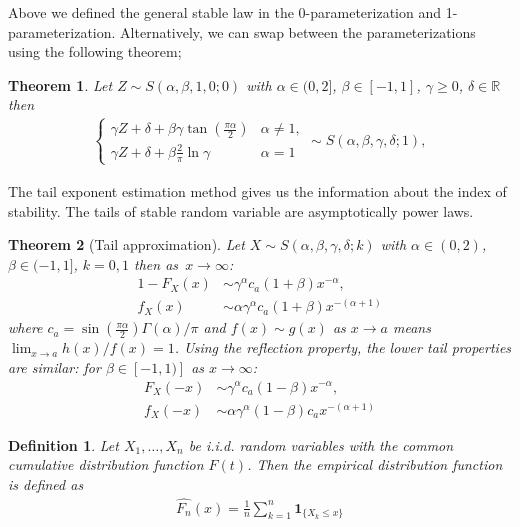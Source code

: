 \documentclass{article}
\newtheorem{theorem}{Theorem}
\newtheorem{definition}{Definition}
\begin{document}
		Above we defined the general stable law in the 0-parameterization and 1-parameterization.
		Alternatively, we can swap between the parameterizations using the following theorem;
		\begin{theorem}Let $Z\sim S(\alpha,\beta,1,0;0)$  with $\alpha \in (0,2]$, $\beta \in [-1,1]$, $\gamma \ge 0$, $\delta\in\mathbb{R}$ then  
			\begin{gather*}
				\begin{cases}
					\gamma Z + \delta + \beta \gamma \tan\left(\frac{\pi\alpha}{2}\right) &\alpha\ne1,\\
					\gamma Z + \delta + \beta \frac{2}{\pi}\ln\gamma  &\alpha=1
				\end{cases}\sim S(\alpha,\beta,\gamma,\delta; 1),
			\end{gather*}
		\end{theorem}

		The tail exponent estimation method gives us the information
		about the index of stability. The tails of stable random variable are asymptotically power laws. 
		\begin{theorem}[Tail approximation] Let $X \sim S(\alpha, \beta , \gamma, \delta; k)$ with $\alpha \in (0,2)$, $\beta \in (-1,1]$, $k=0,1$ then as~$x\to \infty$:
			\begin{align*}
				1 - F_X(x) &\sim \gamma^\alpha c_a (1+\beta)x^{-\alpha},\\
				f_X(x) &\sim \alpha \gamma^\alpha c_a (1+\beta) x^{-(\alpha + 1)}
			\end{align*}
			where $c_a = \sin(\frac{\pi\alpha}{2})\Gamma(\alpha)/\pi$ and $f(x)\sim g(x)$ as $x\to a$ means $\lim_{x\to a} h(x)/f(x) = 1$. Using the reflection property, the lower tail properties are
			similar: for $\beta\in[-1,1)]$ as $x \to \infty$:
			\begin{align*}
				F_X(-x) &\sim  \gamma^\alpha c_a (1-\beta)x^{-\alpha},\\
				f_X(-x) &\sim  \alpha \gamma^\alpha (1-\beta)c_a x^{-(\alpha + 1)}
			\end{align*}
		\end{theorem}
		
		\begin{definition}Let $X_1,\dots, X_n$ be i.i.d. random variables with the common cumulative distribution function $F(t)$. 
			Then the empirical distribution function is defined as
			\begin{gather*}
				\hat{F_n}(x) = \frac{1}{n}\sum_{k = 1}^{n}\mathbf{1}_{\{X_k \le x\}}
			\end{gather*}
		\end{definition}
		
\end{document}
